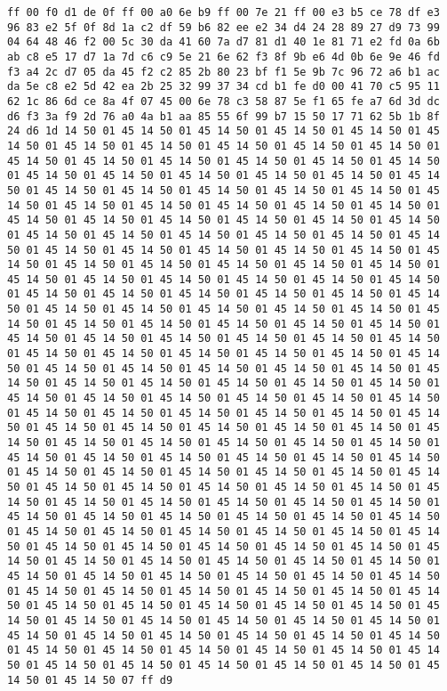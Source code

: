 \documentclass{article}
\begin{document}
\begin{verbatim}
ff 00 f0 d1 de 0f ff 00 a0 6e b9 ff 00 7e 21 ff 00 e3 b5 ce 78 df e3 96 83 e2 5f 0f 8d 1a c2 df 59 b6 82 ee e2 34 d4 24 28 89 27 d9 73 99 04 64 48 46 f2 00 5c 30 da 41 60 7a d7 81 d1 40 1e 81 71 e2 fd 0a 6b ab c8 e5 17 d7 1a 7d c6 c9 5e 21 6e 62 f3 8f 9b e6 4d 0b 6e 9e 46 fd f3 a4 2c d7 05 da 45 f2 c2 85 2b 80 23 bf f1 5e 9b 7c 96 72 a6 b1 ac da 5e c8 e2 5d 42 ea 2b 25 32 99 37 34 cd b1 fe d0 00 41 70 c5 95 11 62 1c 86 6d ce 8a 4f 07 45 00 6e 78 c3 58 87 5e f1 65 fe a7 6d 3d dc d6 f3 3a f9 2d 76 a0 4a b1 aa 85 55 6f 99 b7 15 50 17 71 62 5b 1b 8f 24 d6 1d 14 50 01 45 14 50 01 45 14 50 01 45 14 50 01 45 14 50 01 45 14 50 01 45 14 50 01 45 14 50 01 45 14 50 01 45 14 50 01 45 14 50 01 45 14 50 01 45 14 50 01 45 14 50 01 45 14 50 01 45 14 50 01 45 14 50 01 45 14 50 01 45 14 50 01 45 14 50 01 45 14 50 01 45 14 50 01 45 14 50 01 45 14 50 01 45 14 50 01 45 14 50 01 45 14 50 01 45 14 50 01 45 14 50 01 45 14 50 01 45 14 50 01 45 14 50 01 45 14 50 01 45 14 50 01 45 14 50 01 45 14 50 01 45 14 50 01 45 14 50 01 45 14 50 01 45 14 50 01 45 14 50 01 45 14 50 01 45 14 50 01 45 14 50 01 45 14 50 01 45 14 50 01 45 14 50 01 45 14 50 01 45 14 50 01 45 14 50 01 45 14 50 01 45 14 50 01 45 14 50 01 45 14 50 01 45 14 50 01 45 14 50 01 45 14 50 01 45 14 50 01 45 14 50 01 45 14 50 01 45 14 50 01 45 14 50 01 45 14 50 01 45 14 50 01 45 14 50 01 45 14 50 01 45 14 50 01 45 14 50 01 45 14 50 01 45 14 50 01 45 14 50 01 45 14 50 01 45 14 50 01 45 14 50 01 45 14 50 01 45 14 50 01 45 14 50 01 45 14 50 01 45 14 50 01 45 14 50 01 45 14 50 01 45 14 50 01 45 14 50 01 45 14 50 01 45 14 50 01 45 14 50 01 45 14 50 01 45 14 50 01 45 14 50 01 45 14 50 01 45 14 50 01 45 14 50 01 45 14 50 01 45 14 50 01 45 14 50 01 45 14 50 01 45 14 50 01 45 14 50 01 45 14 50 01 45 14 50 01 45 14 50 01 45 14 50 01 45 14 50 01 45 14 50 01 45 14 50 01 45 14 50 01 45 14 50 01 45 14 50 01 45 14 50 01 45 14 50 01 45 14 50 01 45 14 50 01 45 14 50 01 45 14 50 01 45 14 50 01 45 14 50 01 45 14 50 01 45 14 50 01 45 14 50 01 45 14 50 01 45 14 50 01 45 14 50 01 45 14 50 01 45 14 50 01 45 14 50 01 45 14 50 01 45 14 50 01 45 14 50 01 45 14 50 01 45 14 50 01 45 14 50 01 45 14 50 01 45 14 50 01 45 14 50 01 45 14 50 01 45 14 50 01 45 14 50 01 45 14 50 01 45 14 50 01 45 14 50 01 45 14 50 01 45 14 50 01 45 14 50 01 45 14 50 01 45 14 50 01 45 14 50 01 45 14 50 01 45 14 50 01 45 14 50 01 45 14 50 01 45 14 50 01 45 14 50 01 45 14 50 01 45 14 50 01 45 14 50 01 45 14 50 01 45 14 50 01 45 14 50 01 45 14 50 01 45 14 50 01 45 14 50 01 45 14 50 01 45 14 50 01 45 14 50 01 45 14 50 01 45 14 50 01 45 14 50 01 45 14 50 01 45 14 50 01 45 14 50 01 45 14 50 01 45 14 50 01 45 14 50 01 45 14 50 01 45 14 50 01 45 14 50 01 45 14 50 01 45 14 50 01 45 14 50 01 45 14 50 01 45 14 50 01 45 14 50 01 45 14 50 01 45 14 50 01 45 14 50 01 45 14 50 01 45 14 50 01 45 14 50 01 45 14 50 01 45 14 50 01 45 14 50 01 45 14 50 01 45 14 50 01 45 14 50 01 45 14 50 01 45 14 50 01 45 14 50 01 45 14 50 01 45 14 50 01 45 14 50 01 45 14 50 01 45 14 50 01 45 14 50 01 45 14 50 01 45 14 50 01 45 14 50 01 45 14 50 01 45 14 50 01 45 14 50 01 45 14 50 01 45 14 50 01 45 14 50 01 45 14 50 01 45 14 50 07 ff d9
\end{verbatim}
\end{document}
